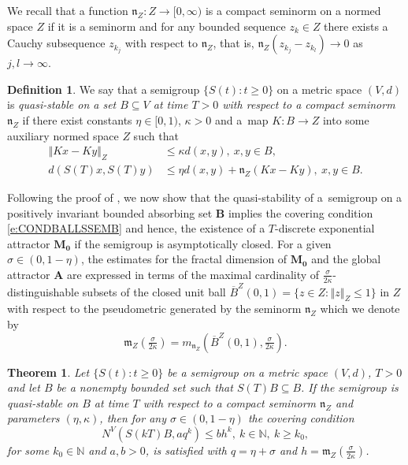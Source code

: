 \documentclass[a4paper,12pt,reqno]{amsart}
\theoremstyle{plain}
\newtheorem{thm}[lem]{Theorem}
\theoremstyle{definition}
\newtheorem{defn}[lem]{Definition}
\numberwithin{equation}{section}
\newcommand{\N}{\mathbb{N}}
\newcommand{\norm}[1]{\left\Vert#1\right\Vert}
\renewcommand{\geq}{\geqslant}
\renewcommand{\leq}{\leqslant}
\begin{document}
We recall that a function $\mathfrak{n}_{Z}\colon Z\to[0,\infty)$ is a compact seminorm on a normed space $Z$ if it is a seminorm and for any bounded sequence $z_k\in Z$ there exists	a Cauchy subsequence $z_{k_j}$ with respect to $\mathfrak{n}_Z$, that is,
$\mathfrak{n}_{Z}(z_{k_j}-z_{k_l})\to 0$ as $j,l\to\infty$.

\begin{defn}\label{defn:QUASISTABILITY}
We say that a semigroup $\{S(t)\colon t\geq 0\}$ on a metric space $(V,d)$ is \emph{quasi-stable on a set $B\subseteq V$ at  time $T>0$ with respect to a compact seminorm} $\mathfrak{n}_{Z}$ if there exist constants $\eta\in[0,1)$, $\kappa>0$
and a~map $K\colon B\to Z$ into some auxiliary normed space $Z$ such that
\begin{align}\label{e:DIMSEM1}
\norm{Kx-Ky}_{Z}&\leq \kappa d(x,y),\ x,y\in B,\\
\label{e:DIMSEM2}
d(S(T)x,S(T)y)&\leq\eta d(x,y)+\mathfrak{n}_{Z}(Kx-Ky),\ x,y\in B.
\end{align}
\end{defn}

Following the proof of \cite[Theorem 3.1.21]{chueshov}, we now show that the quasi-stability
of a~semigroup on a  positively invariant bounded absorbing set $\mathbf{B}$ implies the covering condition  \eqref{e:CONDBALLSSEMB} and hence, the existence of a $T$-discrete exponential attractor $\mathbf{M_0}$ if the semigroup is asymptotically closed. 
For a given $\sigma\in(0,1-\eta)$, the estimates for the fractal dimension of $\mathbf{M_0}$ and the global attractor $\mathbf{A}$ are expressed in terms of the maximal cardinality of $\frac{\sigma}{2\kappa}$-distinguishable subsets of the closed unit ball $\overline{B}^{Z}(0,1)=\{z\in Z\colon\norm{z}_{Z}\leq 1\}$ in $Z$ with respect to the pseudometric generated by the seminorm $\mathfrak{n}_{Z}$ which we denote by
$$\mathfrak{m}_{Z}\left(\tfrac{\sigma}{2\kappa}\right)=m_{\mathfrak{n}_Z}(\overline{B}^{Z}(0,1),\tfrac{\sigma}{2\kappa}).$$

\begin{thm}\label{thm:QUASI}
Let $\{S(t)\colon t\geq 0\}$ be a semigroup on a metric space $(V,d)$, $T>0$ and let $B$ be a nonempty bounded set such that $S(T)B\subseteq B$. If the semigroup is quasi-stable on $B$ at time $T$ with respect to a compact seminorm $\mathfrak{n}_{Z}$ and parameters $(\eta,\kappa)$, then for any $\sigma\in(0,1-\eta)$
the covering condition
\begin{equation}\label{e:CONDBALLSSEMB2}
N^{V}(S(kT)B,aq^{k})\leq b h^{k},\ k\in\N,\ k\geq k_0,
\end{equation}
for some $k_0\in\N$ and $a,b>0$,
is satisfied with  $q=\eta+\sigma$ and $h=\mathfrak{m}_{Z}\left(\tfrac{\sigma}{2\kappa}\right)$.
\end{thm}
\end{document}
